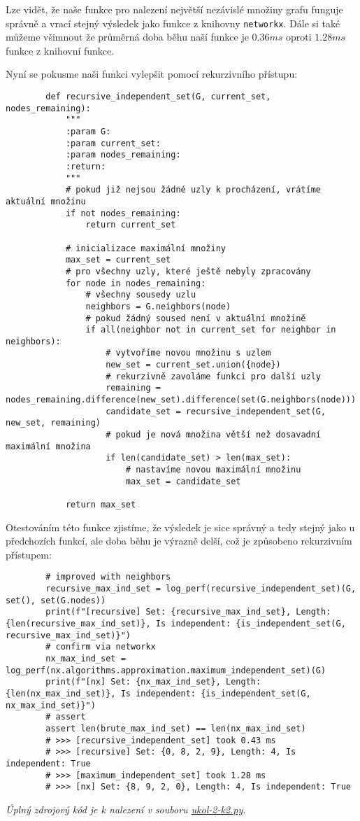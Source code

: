 \documentclass[10pt, a4paper]{ReportSheet}
\begin{document}
    Lze vidět, že naše funkce pro nalezení největší nezávislé množiny grafu funguje správně a vrací stejný výsledek
    jako funkce z knihovny \texttt{networkx}. Dále si také můžeme všimnout že průměrná doba běhu naší funkce je $0
    .36ms$ oproti $1.28ms$ funkce z knihovní funkce.

    Nyní se pokusme naši funkci vylepšit pomocí rekurzivního přístupu:
    \begin{verbatim}
        def recursive_independent_set(G, current_set, nodes_remaining):
            """
            :param G:
            :param current_set:
            :param nodes_remaining:
            :return:
            """
            # pokud již nejsou žádné uzly k procházení, vrátíme aktuální množinu
            if not nodes_remaining:
                return current_set

            # inicializace maximální množiny
            max_set = current_set
            # pro všechny uzly, které ještě nebyly zpracovány
            for node in nodes_remaining:
                # všechny sousedy uzlu
                neighbors = G.neighbors(node)
                # pokud žádný soused není v aktuální množině
                if all(neighbor not in current_set for neighbor in neighbors):
                    # vytvoříme novou množinu s uzlem
                    new_set = current_set.union({node})
                    # rekurzivně zavoláme funkci pro další uzly
                    remaining = nodes_remaining.difference(new_set).difference(set(G.neighbors(node)))
                    candidate_set = recursive_independent_set(G, new_set, remaining)
                    # pokud je nová množina větší než dosavadní maximální množina
                    if len(candidate_set) > len(max_set):
                        # nastavíme novou maximální množinu
                        max_set = candidate_set

            return max_set
    \end{verbatim}

    Otestováním této funkce zjistíme, že výsledek je sice správný a tedy stejný jako u předchozích funkcí, ale doba
    běhu je výrazně delší, což je způsobeno rekurzivním přístupem:
    \begin{verbatim}
        # improved with neighbors
        recursive_max_ind_set = log_perf(recursive_independent_set)(G, set(), set(G.nodes))
        print(f"[recursive] Set: {recursive_max_ind_set}, Length: {len(recursive_max_ind_set)}, Is independent: {is_independent_set(G, recursive_max_ind_set)}")
        # confirm via networkx
        nx_max_ind_set = log_perf(nx.algorithms.approximation.maximum_independent_set)(G)
        print(f"[nx] Set: {nx_max_ind_set}, Length: {len(nx_max_ind_set)}, Is independent: {is_independent_set(G, nx_max_ind_set)}")
        # assert
        assert len(brute_max_ind_set) == len(nx_max_ind_set)
        # >>> [recursive_independent_set] took 0.43 ms
        # >>> [recursive] Set: {0, 8, 2, 9}, Length: 4, Is independent: True
        # >>> [maximum_independent_set] took 1.28 ms
        # >>> [nx] Set: {8, 9, 2, 0}, Length: 4, Is independent: True
    \end{verbatim}

    \textit{
        Úplný zdrojový kód je k nalezení v souboru \href{https://github.com/filipditrich/MMAD-2024/blob/main/ukol-2-k2.py}{ukol-2-k2.py}.
    }
    \newpage
\end{document}
